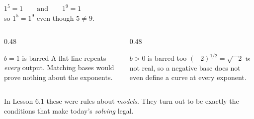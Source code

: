 \documentclass[aspectratio=169, 11pt]{beamer}
\begin{document}
\begin{frame}[t, plain]
  \begin{center}
    \Large $1^{5} = 1 \qquad\text{and}\qquad 1^{9} = 1$ \\[6pt]
    \normalsize so $1^{5}=1^{9}$ \; even though \; $5\neq9$.
  \end{center}
  \vspace{10pt}
  \begin{columns}[T]
    \begin{column}{0.48\textwidth}
      \begin{block}{$b=1$ is barred}
        A flat line repeats \emph{every} output. Matching bases would prove nothing about the
        exponents.
      \end{block}
    \end{column}
    \begin{column}{0.48\textwidth}
      \begin{block}{$b>0$ is barred too}
        $(-2)^{1/2}=\sqrt{-2}$ is not real, so a negative base does not even define a curve at every
        exponent.
      \end{block}
    \end{column}
  \end{columns}
  \vspace{8pt}
  \begin{center}
    {\footnotesize In Lesson 6.1 these were rules about \emph{models}. They turn out to be exactly the
    conditions that make today's \emph{solving} legal.}
  \end{center}
\end{frame}
\end{document}
